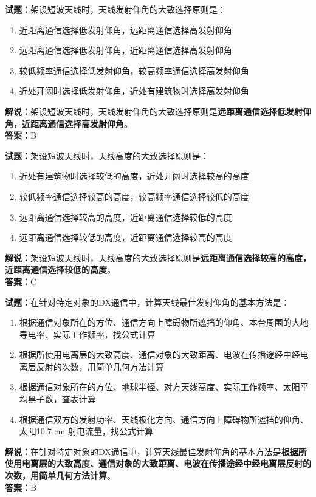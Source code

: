 \documentclass{ctexbook}
\begin{document}
\textbf{试题：}架设短波天线时，天线发射仰角的大致选择原则是：
\begin{enumerate}[leftmargin=3em]
  \item 近距离通信选择低发射仰角，远距离通信选择高发射仰角
  \item 远距离通信选择低发射仰角，近距离通信选择高发射仰角
  \item 较低频率通信选择低发射仰角，较高频率通信选择高发射仰角
  \item 近处开阔时选择低发射仰角，近处有建筑物时选择高发射仰角
\end{enumerate}
\noindent\textbf{解说：}架设短波天线时，天线发射仰角的大致选择原则是\textbf{远距离通信选择低发射仰角，近距离通信选择高发射仰角}。\\\noindent\textbf{答案：}B

\vspace{1em}

\textbf{试题：}架设短波天线时，天线高度的大致选择原则是：
\begin{enumerate}[leftmargin=3em]
  \item 近处有建筑物时选择较低的高度，近处开阔时选择较高的高度
  \item 较低频率通信选择较高的高度，较高频率通信选择较低的高度
  \item 远距离通信选择较高的高度，近距离通信选择较低的高度
  \item 远距离通信选择较低的高度，近距离通信选择较高的高度
\end{enumerate}
\noindent\textbf{解说：}架设短波天线时，天线高度的大致选择原则是\textbf{远距离通信选择较高的高度，近距离通信选择较低的高度}。\\\noindent\textbf{答案：}C

\vspace{1em}

\textbf{试题：}在针对特定对象的DX通信中，计算天线最佳发射仰角的基本方法是：
\begin{enumerate}[leftmargin=3em]
  \item 根据通信对象所在的方位、通信方向上障碍物所遮挡的仰角、本台周围的大地导电率、实际工作频率，找公式计算
  \item 根据所使用电离层的大致高度、通信对象的大致距离、电波在传播途经中经电离层反射的次数，用简单几何方法计算
  \item 根据通信对象所在的方位、地球半径、对方天线高度、实际工作频率、太阳平均黑子数，查表计算
  \item 根据通信双方的发射功率、天线极化方向、通信方向上障碍物所遮挡的仰角、太阳10.7 cm 射电流量，找公式计算
\end{enumerate}
\noindent\textbf{解说：}在针对特定对象的DX通信中，计算天线最佳发射仰角的基本方法是\textbf{根据所使用电离层的大致高度、通信对象的大致距离、电波在传播途经中经电离层反射的次数，用简单几何方法计算}。\\\noindent\textbf{答案：}B
\end{document}
